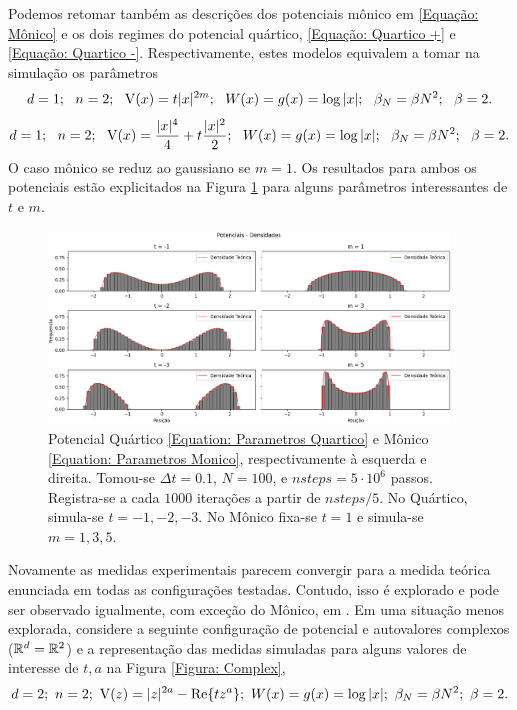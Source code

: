Podemos retomar também as descrições dos potenciais mônico em \ref{Equação: Mônico} e os dois regimes do potencial quártico, \ref{Equação: Quartico +} e \ref{Equação: Quartico -}. Respectivamente, estes modelos equivalem a tomar na simulação os parâmetros
\begin{equation}
	d = 1; \ \  n = 2; \ \ \operatorname{V}(x)= t |x|^{2m}; \ \ W(x) = g(x) = \log{|x|}; \ \ \beta_N = \beta N^2; \ \ \beta = 2.
	\label{Equation: Parametros Monico}
\end{equation}
\begin{equation}
	d = 1; \ \  n = 2; \ \ \V(x)=\frac{|x|^4}{4} + t \frac{|x|^2}{2}; \ \ W(x) = g(x) = \log{|x|}; \ \ \beta_N = \beta N^2; \ \ \beta = 2.
	\label{Equation: Parametros Quartico}
\end{equation}
O caso mônico se reduz ao gaussiano se $m=1$. Os resultados para ambos os potenciais estão explicitados na Figura \ref{Figura: Quartic Monic} para alguns parâmetros interessantes de $t$ e $m$.
\begin{figure}[ht!]
	\centering
	\includegraphics[width=0.95\textwidth]{Assets/validationQuarticMonic-alt.png}
	\caption{Potencial Quártico \ref{Equation: Parametros Quartico} e Mônico \ref{Equation: Parametros Monico}, respectivamente à esquerda e direita. Tomou-se $\Delta t = 0.1$, $N=100$, e $nsteps = 5\cdot10^6$ passos. Registra-se a cada $1000$ iterações a partir de $nsteps/5$. No Quártico, simula-se $t=-1,-2,-3$. No Mônico fixa-se $t=1$ e simula-se $m=1,3,5$.}
	\label{Figura: Quartic Monic}
\end{figure}

Novamente as medidas experimentais parecem convergir para a medida teórica enunciada em todas as configurações testadas. Contudo, isso é explorado e pode ser observado igualmente, com exceção do Mônico, em \cite{Chafa2018}. Em uma situação menos explorada, considere a seguinte configuração de potencial e autovalores complexos ($\mathbb{R}^d = \mathbb{R}^2$) e a representação das medidas simuladas para alguns valores de interesse de $t, a$ na Figura \ref{Figura: Complex},
\begin{equation}
	d = 2; \  n = 2; \  \operatorname{V}(z)=|z|^{2a} - \Re{t z^a};  \ W(x) = g(x) = \log{|x|};  \ \beta_N = \beta N^2;  \ \beta = 2.
	\label{Equation: Complex}
\end{equation}

